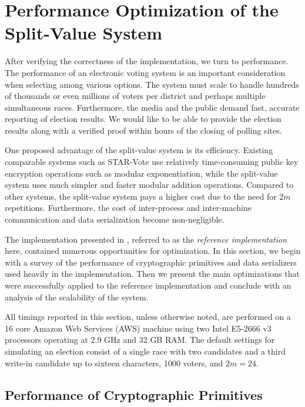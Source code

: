 \chapter{Performance Optimization of the Split-Value System} \label{perf}

After verifying the correctness of the implementation, we turn to performance. The performance of an electronic voting system is an important consideration when selecting among various options. The system must scale to handle hundreds of thousands or even millions of voters per district and perhaps multiple simultaneous races. Furthermore, the media and the public demand fast, accurate reporting of election results. We would like to be able to provide the election results along with a verified proof within hours of the closing of polling sites.

One proposed advantage of the split-value system is its efficiency. Existing comparable systems such as STAR-Vote \cite{starvote} use relatively time-consuming public key encryption operations such as modular exponentiation, while the split-value system uses much simpler and faster modular addition operations. Compared to other systems, the split-value system pays a higher cost due to the need for $2m$ repetitions. Furthermore, the cost of inter-process and inter-machine communication and data serialization become non-negligible.

The implementation presented in \cite{marco}, referred to as the \emph{reference implementation} here, contained numerous opportunities for optimization. In this section, we begin with a survey of the performance of cryptographic primitives and data serializers used heavily in the implementation. Then we present the main optimizations that were successfully applied to the reference implementation and conclude with an analysis of the scalability of the system.

All timings reported in this section, unless otherwise noted, are performed on a 16 core Amazon Web Services (AWS) machine using two Intel E5-2666 v3 processors operating at 2.9 GHz and 32 GB RAM. The default settings for simulating an election consist of a single race with two candidates and a third write-in candidate up to sixteen characters, 1000 voters, and $2m = 24$.

\section{Performance of Cryptographic Primitives} \label{perf:crypto}

